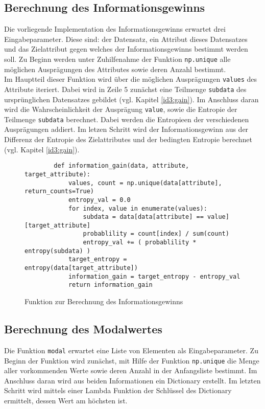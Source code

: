 \subsection{Berechnung des Informationsgewinns}
\label{id3:implementation-ig}
Die vorliegende Implementation des Informationsgewinns erwartet drei Eingabeparameter. Diese sind: der Datensatz, ein Attribut dieses Datensatzes und das Zielattribut gegen welches der Informationsgewinns bestimmt werden soll. Zu Beginn werden unter Zu­hil­fe­nah­me der Funktion \texttt{np.unique} alle möglichen Ausprägungen des Attributes sowie deren Anzahl bestimmt.\\
Im Hauptteil dieser Funktion wird über die möglichen Ausprägungen \texttt{values} des Attribute iteriert. Dabei wird in Zeile 5 zunächst eine Teilmenge \texttt{subdata} des ursprünglichen Datensatzes gebildet (vgl. Kapitel \ref{id3:gain}). Im Anschluss daran wird die Wahrscheinlichkeit der Ausprägung \texttt{value}, sowie die Entropie der Teilmenge \texttt{subdata} berechnet. Dabei werden die Entropieen der verschiedenen Ausprägungen addiert. Im letzen Schritt wird der Informationsgewinn aus der Differenz der Entropie des Zielattributes und der bedingten Entropie berechnet (vgl. Kapitel \ref{id3:gain}).

\begin{figure}[H]
    \centering
    \begin{verbatim}
        def information_gain(data, attribute, target_attribute):
            values, count = np.unique(data[attribute], return_counts=True)
            entropy_val = 0.0
            for index, value in enumerate(values):
                subdata = data[data[attribute] == value][target_attribute]
                probablility = count[index] / sum(count)
                entropy_val += ( probablility * entropy(subdata) )
            target_entropy = entropy(data[target_attribute])
            information_gain = target_entropy - entropy_val
            return information_gain
    \end{verbatim}
    \caption{Funktion zur Berechnung des Informationsgewinns \autocites{PythonCourseDecisionTrees:online}{ImplementationID3}}
\end{figure}

\subsection{Berechnung des Modalwertes}
\label{id3:implementation-modal}
Die Funktion \texttt{modal} erwartet eine Liste von Elementen als Eingabeparameter. Zu Beginn der Funktion wird zunächst, mit Hilfe der Funktion \texttt{np.unique} die Menge aller vorkommenden Werte sowie deren Anzahl in der Anfangsliste bestimmt. Im Anschluss daran wird aus beiden Informationen ein Dictionary erstellt. Im letzten Schritt wird mittels einer Lambda Funktion der Schlüssel des Dictionary ermittelt, dessen Wert am höchsten ist.

